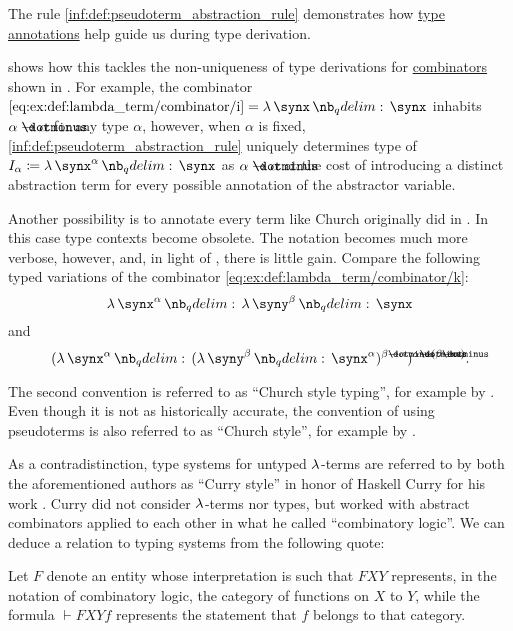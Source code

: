\begin{remark}\label{rem:explicit_and_implicit_typing}
  The rule \ref{inf:def:pseudoterm_abstraction_rule} demonstrates how \hyperref[con:type_annotation]{type annotations} help guide us during type derivation.

   shows how this tackles the non-uniqueness of type derivations for \hyperref[def:lambda_combinator]{combinators} shown in . For example, the combinator \( \ref{eq:ex:def:lambda_term/combinator/i} = \qabs \synx \synx \) inhabits \( \alpha \synimplies \alpha \) for any type \( \alpha \), however, when \( \alpha \) is fixed, \ref{inf:def:pseudoterm_abstraction_rule} uniquely determines  type of \( I_\alpha \coloneqq \qabs {\synx^\alpha} \synx \) as \( \alpha \synimplies \alpha \) at the cost of introducing a distinct abstraction term for every possible annotation of the abstractor variable.

  Another possibility is to annotate every term like Church originally did in \cite{Church1940STT}. In this case type contexts become obsolete. The notation becomes much more verbose, however, and, in light of , there is little gain. Compare the following typed variations of the combinator \ref{eq:ex:def:lambda_term/combinator/k}:
  \begin{equation*}
    \qabs {\synx^\alpha} \qabs {\syny^\beta} \synx
  \end{equation*}
  and
  \begin{equation*}
    (\qabs {\synx^\alpha} (\qabs {\syny^\beta} \synx^\alpha)^{\beta \synimplies \alpha})^{\alpha \synimplies (\beta \synimplies \alpha)}.
  \end{equation*}

  The second convention is referred to as \enquote{Church style typing}, for example by \cite[ch. 5]{Hindley1997STT}. Even though it is not as historically accurate, the convention of using pseudoterms is also referred to as \enquote{Church style}, for example by .

  As a contradistinction, type systems for untyped \( \mathrm{\lambda} \)-terms are referred to by both the aforementioned authors as \enquote{Curry style} in honor of Haskell Curry for his work \cite{Curry1934CombinatoryLogic}. Curry did not consider \( \mathrm{\lambda} \)-terms nor types, but worked with abstract combinators applied to each other in what he called \enquote{combinatory logic}. We can deduce a relation to typing systems from the following quote:
  \begin{displayquote}
    Let \( F \) denote an entity whose interpretation is such that \( FXY \) represents, in the notation of combinatory logic, the category of functions on \( X \) to \( Y \), while the formula \( \vdash FXYf \) represents the statement that \( f \) belongs to that category.
  \end{displayquote}


\end{remark}

